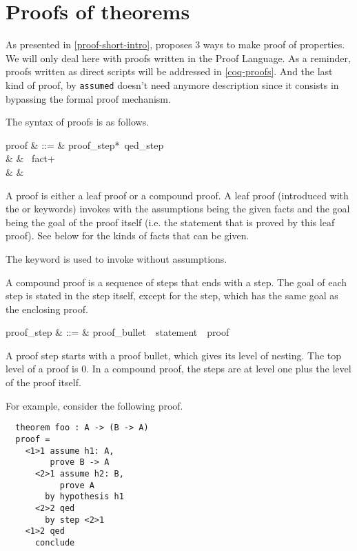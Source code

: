 
\section{Proofs of  theorems}
As presented in \ref{proof-short-intro}, {\focal} proposes 3 ways to
make proof of properties. We will only deal here with proofs written
in the {\focal} Proof Language. As a reminder, proofs written as
direct {\coq} scripts will be addressed in \ref{coq-proofs}. And the
last kind of proof, by {\tt assumed} doesn't need anymore description
since it consists in bypassing the formal proof mechanism.

The syntax of proofs is as follows.
\begin{syntax}
proof & ::=  & proof\_step*\ qed\_step \\
      & \mid & \ fact+{} \\
      & \mid & 
\end{syntax}

A proof is either a leaf proof or a compound proof. A leaf proof
(introduced with the  or  keywords)
invokes \zenon{} with the
assumptions being the given facts and the goal being the goal of the
proof itself (i.e. the statement that is proved by this leaf proof).
See below for the kinds of facts that can be given.

The  keyword is used to invoke \zenon{} without
assumptions.

A compound proof is a sequence of steps that ends with a 
step.  The goal of each step is stated in the step itself, except for
the  step, which has the same goal as the enclosing
proof.

\begin{syntax}
proof\_step & ::=  & proof\_bullet~~statement~~proof
\end{syntax}

A proof step starts with a proof bullet, which gives its level of
nesting.  The top level of a proof is 0.  In a compound proof, the
steps are at level one plus the level of the proof itself.

\goodbreak
For example, consider the following proof.

\begin{verbatim}
  theorem foo : A -> (B -> A)
  proof =
    <1>1 assume h1: A,
         prove B -> A
      <2>1 assume h2: B,
           prove A
        by hypothesis h1
      <2>2 qed
        by step <2>1
    <1>2 qed
      conclude
\end{verbatim}

